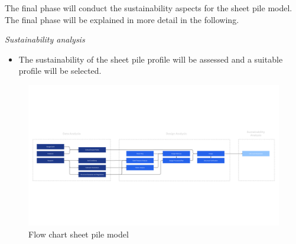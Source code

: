 The final phase will conduct the sustainability aspects for the sheet pile model. The final phase will be explained in more detail in the following.

\textit{Sustainability analysis}

\begin{itemize}
    \item The sustainability of the sheet pile profile will be assessed and a suitable profile will be selected. 
\end{itemize}

\begin{figure}[H]
    \centering
    \includegraphics[width=\linewidth]{figures/ch3/FlowChart Structural (2).png}
    \caption{Flow chart sheet pile model}
    \label{fig:flow_chart}
\end{figure}



